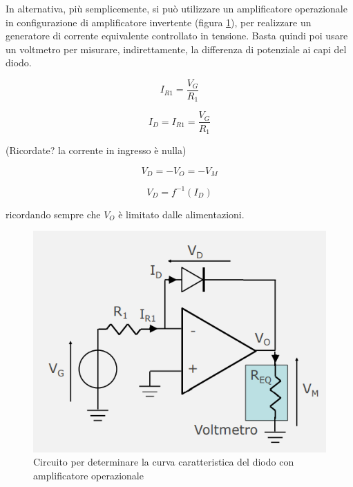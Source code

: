 \documentclass{article}
\begin{document}
\vspace{3mm}

In alternativa, più semplicemente, si può utilizzare un amplificatore operazionale in configurazione di amplificatore invertente (figura \ref{Schema_diodo_misura_ter}), per realizzare un generatore di corrente equivalente controllato in 
tensione. Basta quindi poi usare un voltmetro per misurare, indirettamente, la differenza di potenziale ai capi del diodo.


\[I_{R1} = \frac{V_G}{R_1}\]

\[I_D = I_{R1} = \frac{V_G}{R_1}\]

(Ricordate? la corrente in ingresso è nulla)

\[V_D = - V_O = -V_M\]

\[V_D = f^{-1} (I_D)\]

ricordando sempre che $V_O$ è limitato dalle alimentazioni.

\begin{figure}[h]
  \centering
  \includegraphics[scale=0.55]{IM_diodo_misura_ter}
  \caption{Circuito per determinare la curva caratteristica del diodo con amplificatore operazionale}
  \label{Schema_diodo_misura_ter}
\end{figure}


\clearpage
\end{document}
